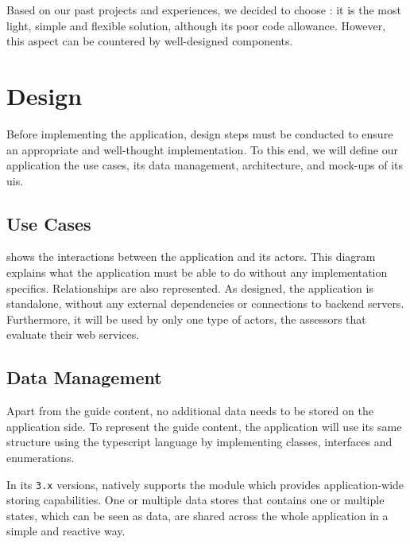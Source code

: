 Based on our past projects and experiences, we decided to choose : it is the most light, simple and flexible solution, although its poor code allowance. However, this aspect can be countered by well-designed components.

\section{Design}
\label{sec:app_design}

Before implementing the application, design steps must be conducted to ensure an appropriate and well-thought implementation. To this end, we will define our application the use cases, its data management, architecture, and mock-ups of its \glspl{ui}.

\subsection{Use Cases}
\label{subsec:app_design_use}

 shows the interactions between the application and its actors. This diagram explains what the application must be able to do without any implementation specifics. Relationships are also represented. As designed, the application is standalone, without any external dependencies or connections to \gls{backend} servers. Furthermore, it will be used by only one type of actors, the assessors that evaluate their web services. 


\subsection{Data Management}
\label{subsec:app_design_data}

Apart from the guide content, no additional data needs to be stored on the application side. To represent the guide content, the application will use its same structure using the \gls{typescript} language by implementing classes, interfaces and enumerations.

In its \texttt{3.x} versions,  natively supports the  module which provides application-wide storing capabilities. One or multiple data stores that contains one or multiple states, which can be seen as data, are shared across the whole application in a simple and reactive way.

